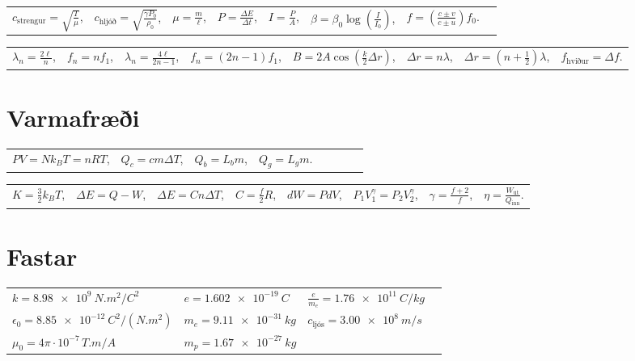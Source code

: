 \begin{table}[H]
\begin{tabular}{llllllll}
 $c_{\text{strengur}} = \sqrt{\frac{T}{\mu}}$, & $c_{\text{hljóð}} = \sqrt{\frac{\gamma P_0}{\rho_0}}$, & $\mu = \frac{m}{\ell}$, & $P = \frac{\Delta E}{\Delta t}$, & $I = \frac{P}{A}$, &$\beta = \beta_0\log(\frac{I}{I_0})$, & $f = \left( \frac{c \pm v}{c \pm u} \right)f_0$.
\end{tabular}
\end{table}

\begin{table}[H]
\begin{tabular}{llllllll}
 $\lambda_n = \frac{2\ell}{n}$, & $f_n = nf_1$, & $\lambda_n = \frac{4\ell}{2n-1}$, & $f_n = (2n-1)f_1$, & $B = 2A\cos(\frac{k}{2}\Delta r)$, &$\Delta r = n \lambda$, & $\Delta r = (n+\frac{1}{2})\lambda$, & $f_{\text{hviður}} = \Delta f$.
\end{tabular}
\end{table}

\section*{Varmafræði}

\begin{table}[H]
\begin{tabular}{llllllll}
$PV = Nk_B T = nRT$, & $Q_c = cm\Delta T$, & $Q_b = L_b m$, & $Q_g = L_g m$.
\end{tabular}
\end{table}


\begin{table}[H]
\begin{tabular}{llllllll}
$K = \frac{3}{2}k_B T$, & $\Delta E = Q - W$, & $\Delta E = Cn\Delta T$, & $C = \frac{f}{2}R$, & $dW = PdV$, & $P_1V_1^\gamma = P_2V_2^\gamma$, & $\gamma = \frac{f+2}{f}$, & $\eta = \frac{W_{\text{út}}}{Q_{\text{inn}}}$.
\end{tabular}
\end{table}

\newpage

\section*{Fastar}

\begin{table}[H]
\begin{tabular}{llll}
$k = \SI{8.98e9}{N.m^2/C^2}$ &  $e = \SI{1.602e-19}{C}$ & $\frac{e}{m_e} = \SI{1.76e11}{C/kg}$  &  \\
$\epsilon_0 = \SI{8.85e-12}{C^2/(N.m^2)}$ & $m_e = \SI{9.11e-31}{kg}$ & $c_{\text{ljós}} = \SI{3.00e8}{m/s}$ & \\
 $\mu_0 = 4\pi \cdot 10^{-7} \, \si{T.m/A}$ & $m_p = \SI{1.67e-27}{kg}$ &  &
\end{tabular}
\end{table}

